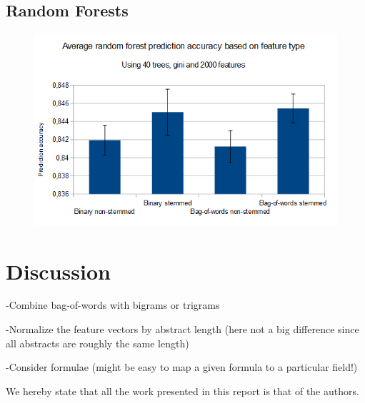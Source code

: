 \documentclass{acm_proc_article-sp}
\begin{document}
\subsection{Random Forests}
\begin{figure} 
\includegraphics[width=1\columnwidth]{rf_feature_types.png}  
\end{figure}

\section{Discussion}
-Combine bag-of-words with bigrams or trigrams

-Normalize the feature vectors by abstract length (here not a big difference since all abstracts are roughly the same length)

-Consider formulae (might be easy to map a given formula to a particular field!)



We hereby state that all the work presented in this report is that of the authors.

%


%
%
\end{document}
